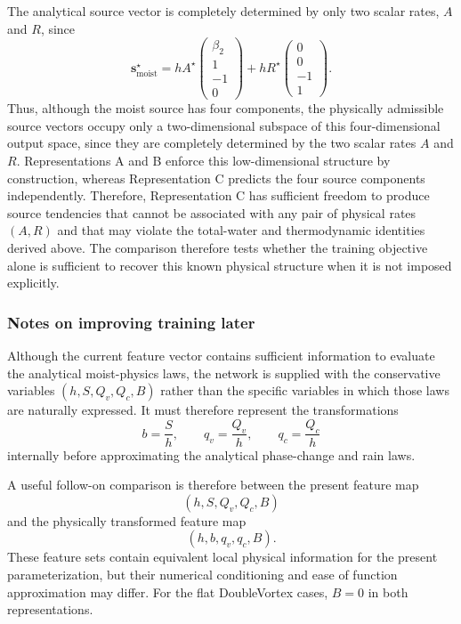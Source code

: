 \documentclass[12pt]{article}
\begin{document}
The analytical source vector is completely determined by only two scalar rates,
$A$ and $R$, since
\begin{equation}
	\mathbf{s}_{\mathrm{moist}}^\star
	=
	hA^\star
	\begin{pmatrix}
		\beta_2\\
		1\\
		-1\\
		0
	\end{pmatrix}
	+
	hR^\star
	\begin{pmatrix}
		0\\
		0\\
		-1\\
		1
	\end{pmatrix}.
	\label{eq:moist_source_subspace}
\end{equation}
Thus, although the moist source has four components, the physically admissible
source vectors occupy only a two-dimensional subspace of this four-dimensional
output space, since they are completely determined by the two scalar rates
$A$ and $R$. Representations A and B enforce this low-dimensional structure
by construction, whereas Representation C predicts the four source components
independently. Therefore, Representation C has sufficient freedom to
produce source tendencies that cannot be associated with any pair of physical
rates $(A,R)$ and that may violate the total-water and thermodynamic identities
derived above. The comparison therefore tests whether the training objective
alone is sufficient to recover this known physical structure when it is not
imposed explicitly.

\subsubsection{Notes on improving training later}
Although the current feature vector contains sufficient information to
evaluate the analytical moist-physics laws, the network is supplied with the
conservative variables $(h,S,Q_v,Q_c,B)$ rather than the specific variables
in which those laws are naturally expressed. It must therefore represent the
transformations
\begin{equation}
	b=\frac{S}{h},
	\qquad
	q_v=\frac{Q_v}{h},
	\qquad
	q_c=\frac{Q_c}{h}
\end{equation}
internally before approximating the analytical phase-change and rain laws.

A useful follow-on comparison is therefore between the present feature map
\begin{equation}
	(h,S,Q_v,Q_c,B)
\end{equation}
and the physically transformed feature map
\begin{equation}
	(h,b,q_v,q_c,B).
\end{equation}
These feature sets contain equivalent local physical information for the
present parameterization, but their numerical conditioning and ease of
function approximation may differ. For the flat DoubleVortex cases,
$B=0$ in both representations.
\end{document}
